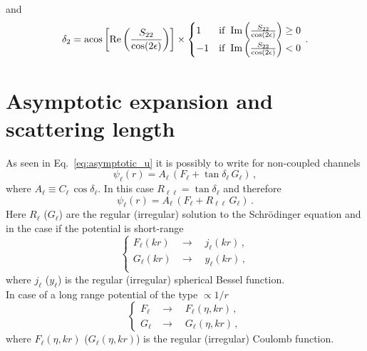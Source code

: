 \documentclass[10pt,a4paper]{article}
\newcommand{\eq}[1]{Eq.~#1}
\begin{document}
	and 
	\begin{equation}
		\delta_2 =
		\acos\left[\Re\left(\frac{S_{22}}{\cos(2\epsilon)}\right)\right]
		\times
		\begin{cases}
			1 & \mathrm{if~}\Im\left(\frac{S_{22}}{\cos(2\epsilon)}\right) \ge 0 \\
			-1 & \mathrm{if~}\Im\left(\frac{S_{22}}{\cos(2\epsilon)}\right) < 0
		\end{cases}\,.
	\end{equation}
	
	
	
		\section{Asymptotic expansion and scattering length}
		As seen in \eq{\eqref{eq:asymptotic_u}} it is possibly to write for non-coupled channels
		\begin{equation}
			\psi_\ell(r) = 
			A_\ell\,
			\left(
				F_\ell
				+ \tan \delta_\ell \,
				G_\ell
			\right)\,,
		\end{equation}
		where $A_\ell \equiv C_\ell\, \cos \delta_\ell$.
		In this case $R_{\ell \ell } = \tan \delta_\ell$ and therefore
		\begin{equation}
			\psi_\ell(r) = 
			A_\ell\,
			\left(
			F_\ell
			+ R_{\ell\ell} \,
			G_\ell
			\right)\,.
		\end{equation}
		Here $R_\ell$ ($G_\ell$) are the regular (irregular) solution to the Schr\"odinger equation and in the case if the potential is short-range 
		\begin{equation}
			\begin{cases}
				F_\ell(kr) &\rightarrow\quad j_\ell(kr)\,,\\
				G_\ell(kr) &\rightarrow\quad y_\ell(kr)\,,\\
			\end{cases}
		\end{equation}
		where $j_\ell$ ($y_\ell$) is the regular (irregular) spherical Bessel function.\\
		In case of a long range potential of the type $\propto 1/r$ 
		\begin{equation}
			\begin{cases}
				F_\ell & \rightarrow \quad F_\ell(\eta, kr)\,,\\
				G_\ell & \rightarrow \quad G_\ell(\eta, kr)\,,
			\end{cases}
		\end{equation}
		where $F_\ell(\eta,kr)$ ($G_\ell(\eta,kr)$) is the regular (irregular) Coulomb function.
		
\end{document}
